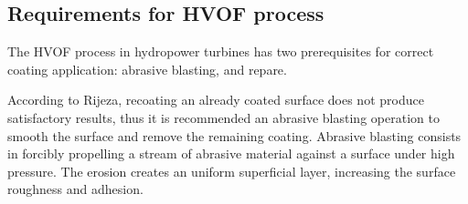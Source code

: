 \subsection{Requirements for HVOF process}

The HVOF process in hydropower turbines has two prerequisites for correct
coating application: abrasive blasting, and repare. %


According to Rijeza, recoating an already coated surface does
not produce satisfactory results, thus it is recommended an abrasive blasting
operation to smooth the surface and remove the remaining coating. Abrasive blasting consists in forcibly propelling a stream of abrasive
material against a surface under high pressure. The erosion creates an uniform
superficial layer, increasing the surface roughness and
adhesion.



